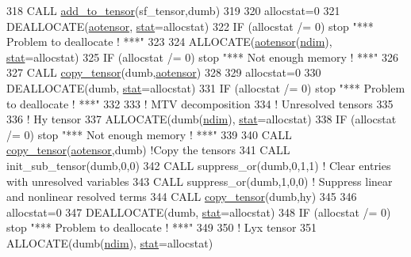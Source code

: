 \begin{DoxyCode}
318     \textcolor{keyword}{CALL }\hyperlink{namespacetensor_aad7cd55f3a4cec4676cc7ca34b05f1a8}{add\_to\_tensor}(sf\_tensor,dumb)
319 
320     allocstat=0
321     \textcolor{keyword}{DEALLOCATE}(\hyperlink{namespaceaotensor__def_a0dc43bc9294a18f2fe57b67489f1702f}{aotensor}, \hyperlink{namespacestat}{stat}=allocstat)
322     \textcolor{keywordflow}{IF} (allocstat /= 0)  stop \textcolor{stringliteral}{"*** Problem to deallocate ! ***"}
323 
324     \textcolor{keyword}{ALLOCATE}(\hyperlink{namespaceaotensor__def_a0dc43bc9294a18f2fe57b67489f1702f}{aotensor}(\hyperlink{namespaceparams_a2323fe1773f086e20c14f266351c482b}{ndim}), \hyperlink{namespacestat}{stat}=allocstat)
325     \textcolor{keywordflow}{IF} (allocstat /= 0) stop \textcolor{stringliteral}{"*** Not enough memory ! ***"}
326 
327     \textcolor{keyword}{CALL }\hyperlink{namespacetensor_a4a88ee8077278486c5128ad97617969e}{copy\_tensor}(dumb,\hyperlink{namespaceaotensor__def_a0dc43bc9294a18f2fe57b67489f1702f}{aotensor})
328 
329     allocstat=0
330     \textcolor{keyword}{DEALLOCATE}(dumb, \hyperlink{namespacestat}{stat}=allocstat)
331     \textcolor{keywordflow}{IF} (allocstat /= 0)  stop \textcolor{stringliteral}{"*** Problem to deallocate ! ***"}
332 
333     \textcolor{comment}{! MTV decomposition}
334     \textcolor{comment}{! Unresolved tensors}
335 
336     \textcolor{comment}{! Hy tensor}
337     \textcolor{keyword}{ALLOCATE}(dumb(\hyperlink{namespaceparams_a2323fe1773f086e20c14f266351c482b}{ndim}), \hyperlink{namespacestat}{stat}=allocstat)
338     \textcolor{keywordflow}{IF} (allocstat /= 0) stop \textcolor{stringliteral}{"*** Not enough memory ! ***"}
339 
340     \textcolor{keyword}{CALL }\hyperlink{namespacetensor_a4a88ee8077278486c5128ad97617969e}{copy\_tensor}(\hyperlink{namespaceaotensor__def_a0dc43bc9294a18f2fe57b67489f1702f}{aotensor},dumb) \textcolor{comment}{!Copy the tensors}
341     \textcolor{keyword}{CALL }init\_sub\_tensor(dumb,0,0)
342     \textcolor{keyword}{CALL }suppress\_or(dumb,0,1,1) \textcolor{comment}{! Clear entries with unresolved variables}
343     \textcolor{keyword}{CALL }suppress\_or(dumb,1,0,0) \textcolor{comment}{! Suppress linear and nonlinear resolved terms}
344     \textcolor{keyword}{CALL }\hyperlink{namespacetensor_a4a88ee8077278486c5128ad97617969e}{copy\_tensor}(dumb,hy)
345 
346     allocstat=0
347     \textcolor{keyword}{DEALLOCATE}(dumb, \hyperlink{namespacestat}{stat}=allocstat)
348     \textcolor{keywordflow}{IF} (allocstat /= 0)  stop \textcolor{stringliteral}{"*** Problem to deallocate ! ***"}
349 
350     \textcolor{comment}{! Lyx tensor}
351     \textcolor{keyword}{ALLOCATE}(dumb(\hyperlink{namespaceparams_a2323fe1773f086e20c14f266351c482b}{ndim}), \hyperlink{namespacestat}{stat}=allocstat)

\end{DoxyCode}
